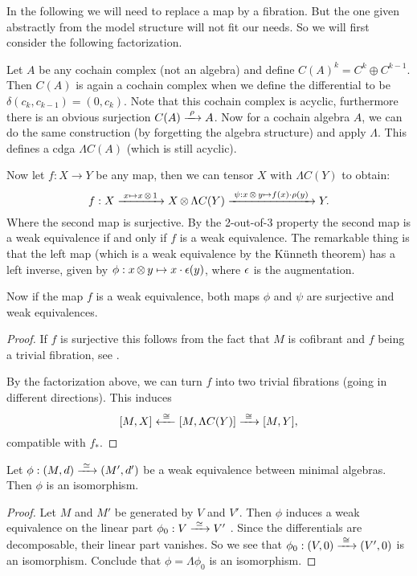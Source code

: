 In the following we will need to replace a map by a fibration. But the one given abstractly from the model structure will not fit our needs. So we will first consider the following factorization.

Let $A$ be any cochain complex (not an algebra) and define $C(A)^k = C^k \oplus C^{k-1}$. Then $C(A)$ is again a cochain complex when we define the differential to be $\delta(c_k, c_{k-1}) = (0, c_k)$. Note that this cochain complex is acyclic, furthermore there is an obvious surjection $C(A) \xrightarrow{\,\,{\rho}\,\,} A$. Now for a cochain algebra $A$, we can do the same construction (by forgetting the algebra structure) and apply $\Lambda$. This defines a cdga $\Lambda C(A)$ (which is still acyclic).

Now let $f: X \to Y$ be any map, then we can tensor $X$ with $\Lambda C(Y)$ to obtain:
$$ f: X \xrightarrow{\,\,{x \mapsto x \operatorname*{\otimes} 1}\,\,} X \operatorname*{\otimes} \Lambda C(Y) \xrightarrow{\,\,{\psi: x \operatorname*{\otimes} y \mapsto f(x) \cdot \rho (y)}\,\,} Y. $$
Where the second map is surjective. By the 2-out-of-3 property the second map is a weak equivalence if and only if $f$ is a weak equivalence. The remarkable thing is that the left map (which is a weak equivalence by the Künneth theorem) has a left inverse, given by $\phi: x \operatorname*{\otimes} y \mapsto x \cdot \epsilon (y)$, where $\epsilon$ is the augmentation.

Now if the map $f$ is a weak equivalence, both maps $\phi$ and $\psi$ are surjective and weak equivalences.

\begin{proof}
	If $f$ is surjective this follows from the fact that $M$ is cofibrant and $f$ being a trivial fibration, see .

	By the factorization above, we can turn $f$ into two trivial fibrations (going in different directions). This induces
	$$ [M, X] \xleftarrow{\,\,{\cong}\,\,} [M, \Lambda C(Y)] \xrightarrow{\,\,{\cong}\,\,} [M, Y], $$
	compatible with $f_\ast$.
\end{proof}

\begin{lemma}
	Let $\phi: (M, d) \xrightarrow{\,\,{\simeq}\,\,} (M', d')$ be a weak equivalence between minimal algebras. Then $\phi$ is an isomorphism.
\end{lemma}
\begin{proof}
	Let $M$ and $M'$ be generated by $V$ and $V'$. Then $\phi$ induces a weak equivalence on the linear part $\phi_0: V \xrightarrow{\,\,{\simeq}\,\,} V'$ \cite[Theorem 1.5.2]{loday}. Since the differentials are decomposable, their linear part vanishes. So we see that $\phi_0: (V, 0) \xrightarrow{\,\,{\cong}\,\,} (V', 0)$ is an isomorphism.
	Conclude that $\phi = \Lambda \phi_0$ is an isomorphism.
\end{proof}

